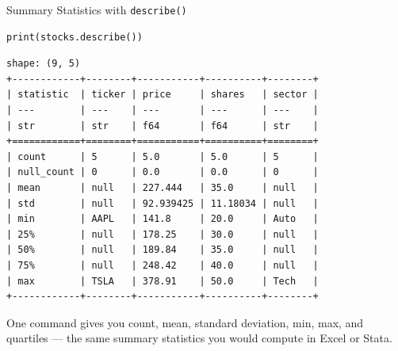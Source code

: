 \documentclass[9pt,aspectratio=169]{beamer}
\begin{document}
\begin{frame}[fragile]{Summary Statistics with \texttt{describe()}}

\begin{lstlisting}
print(stocks.describe())
\end{lstlisting}

\begin{lstlisting}[style=output]
shape: (9, 5)
+------------+--------+-----------+----------+--------+
| statistic  | ticker | price     | shares   | sector |
| ---        | ---    | ---       | ---      | ---    |
| str        | str    | f64       | f64      | str    |
+============+========+===========+==========+========+
| count      | 5      | 5.0       | 5.0      | 5      |
| null_count | 0      | 0.0       | 0.0      | 0      |
| mean       | null   | 227.444   | 35.0     | null   |
| std        | null   | 92.939425 | 11.18034 | null   |
| min        | AAPL   | 141.8     | 20.0     | Auto   |
| 25%        | null   | 178.25    | 30.0     | null   |
| 50%        | null   | 189.84    | 35.0     | null   |
| 75%        | null   | 248.42    | 40.0     | null   |
| max        | TSLA   | 378.91    | 50.0     | Tech   |
+------------+--------+-----------+----------+--------+
\end{lstlisting}

One command gives you count, mean, standard deviation, min, max, and quartiles --- the same summary statistics you would compute in Excel or Stata.

\end{frame}
\end{document}
